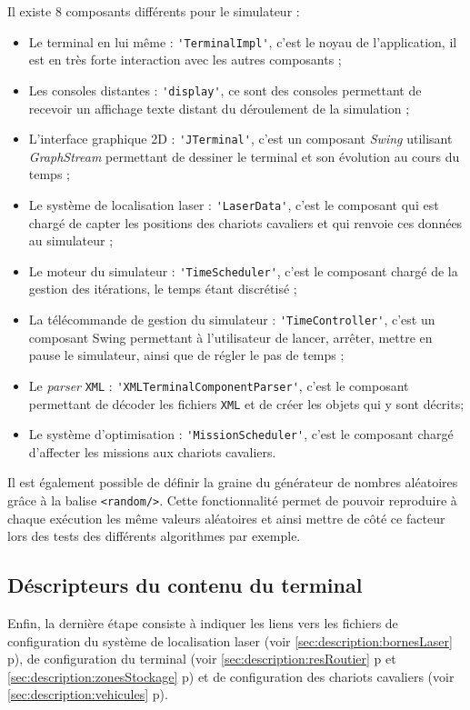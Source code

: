 Il existe 8 composants différents pour le simulateur : 
\begin {itemize}
 \item Le terminal en lui même : \verb!'TerminalImpl'!, c'est le noyau de l'application, il est en très forte interaction avec les autres composants ;
 \item Les consoles distantes : \verb!'display'!, ce sont des consoles permettant de recevoir un affichage texte distant du déroulement de la simulation ;
 \item L'interface graphique 2D : \verb!'JTerminal'!, c'est un composant \textit{Swing} utilisant \textit{GraphStream} permettant de dessiner le terminal et son évolution au cours du temps ;
 \item Le système de localisation laser : \verb!'LaserData'!, c'est le composant qui est chargé de capter les positions des chariots cavaliers et qui renvoie ces données au simulateur ;
 \item Le moteur du simulateur : \verb!'TimeScheduler'!, c'est le composant chargé de la gestion des itérations, le temps étant discrétisé ;
 \item La télécommande de gestion du simulateur : \verb!'TimeController'!, c'est un composant Swing permettant à l'utilisateur de lancer, arrêter, mettre en pause le simulateur, ainsi que de régler le pas de temps ;
 \item Le \textit{parser} \verb!XML! : \verb!'XMLTerminalComponentParser'!, c'est le composant permettant de décoder les fichiers \verb!XML! et de créer les objets qui y sont décrits;
 \item Le système d'optimisation : \verb!'MissionScheduler'!, c'est le composant chargé d'affecter les missions aux chariots cavaliers. 
\end {itemize}

Il est également possible de définir la graine du générateur de nombres aléatoires grâce à la balise \verb!<random/>!. Cette fonctionnalité permet de pouvoir reproduire à chaque exécution les même valeurs aléatoires et ainsi mettre de côté ce facteur lors des tests des différents algorithmes par exemple.

\subsection{Déscripteurs du contenu du terminal}\label{chap:simulateur:sec:archi:distribution:contenu}

Enfin, la dernière étape consiste à indiquer les liens vers les fichiers de configuration du système de localisation laser (voir \ref{sec:description:bornesLaser} p\pageref{sec:description:bornesLaser}), de configuration du terminal (voir \ref{sec:description:resRoutier} p\pageref{sec:description:resRoutier} et \ref{sec:description:zonesStockage} p\pageref{sec:description:zonesStockage}) et de configuration des chariots cavaliers (voir \ref{sec:description:vehicules} p\pageref{sec:description:vehicules}).

